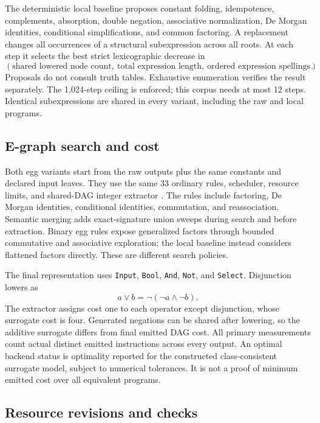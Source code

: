 \documentclass[11pt]{article}
\begin{document}
The deterministic local baseline proposes constant folding, idempotence,
complements, absorption, double negation, associative normalization,
De Morgan identities, conditional simplifications, and common factoring.
A replacement changes all occurrences of a structural subexpression across
all roots. At each step it selects the best strict lexicographic decrease in
\[
   (\text{shared lowered node count},\
     \text{total expression length},\
     \text{ordered expression spellings}).
\]
Proposals do not consult truth tables. Exhaustive enumeration verifies the
result separately. The 1,024-step ceiling is enforced; this corpus needs at
most 12 steps. Identical subexpressions are shared in every variant, including
the raw and local programs.

\subsection{E-graph search and cost}

Both egg variants start from the raw outputs plus the same constants and
declared input leaves. They use the same 33 ordinary rules, scheduler,
resource limits, and shared-DAG integer extractor \cite{extractor}. The rules include factoring,
De Morgan identities, conditional identities, commutation, and reassociation.
Semantic merging adds exact-signature union sweeps during search and before
extraction. Binary egg rules expose generalized factors through bounded
commutative and associative exploration; the local baseline instead considers
flattened factors directly. These are different search policies.

The final representation uses \texttt{Input}, \texttt{Bool}, \texttt{And},
\texttt{Not}, and \texttt{Select}. Disjunction lowers as
\[
  a\lor b=\neg(\neg a\land\neg b).
\]
The extractor assigns cost one to each operator except disjunction, whose
surrogate cost is four. Generated negations can be shared after lowering, so
the additive surrogate differs from final emitted DAG cost. All primary
measurements count actual distinct emitted instructions across every output.
An optimal backend status is optimality reported for the constructed
class-consistent surrogate model, subject to numerical tolerances.
It is not a proof of minimum emitted cost over all equivalent programs.

\subsection{Resource revisions and checks}
\end{document}
